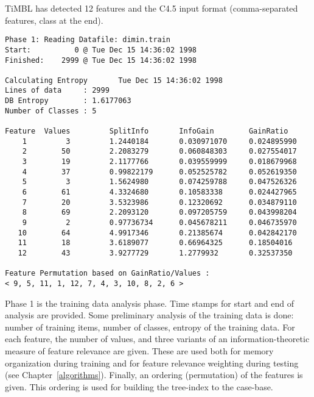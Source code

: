 \documentclass{report}
\begin{document}
\hline
\vspace{1cm}

TiMBL has detected 12 features and the C4.5 input format
(comma-separated features, class at the end).

\vspace{2cm}
\hline

{\small
\begin{verbatim}
Phase 1: Reading Datafile: dimin.train
Start:          0 @ Tue Dec 15 14:36:02 1998
Finished:    2999 @ Tue Dec 15 14:36:02 1998

Calculating Entropy       Tue Dec 15 14:36:02 1998
Lines of data     : 2999
DB Entropy        : 1.6177063
Number of Classes : 5

Feature  Values         SplitInfo       InfoGain        GainRatio
    1         3         1.2440184       0.030971070     0.024895990
    2        50         2.2083279       0.060848303     0.027554017
    3        19         2.1177766       0.039559999     0.018679968
    4        37         0.99822179      0.052525782     0.052619350
    5         3         1.5624980       0.074259788     0.047526326
    6        61         4.3324680       0.10583338      0.024427965
    7        20         3.5323986       0.12320692      0.034879110
    8        69         2.2093120       0.097205759     0.043998204
    9         2         0.97736734      0.045678211     0.046735970
   10        64         4.9917346       0.21385674      0.042842170
   11        18         3.6189077       0.66964325      0.18504016
   12        43         3.9277729       1.2779932       0.32537350

Feature Permutation based on GainRatio/Values :
< 9, 5, 11, 1, 12, 7, 4, 3, 10, 8, 2, 6 >
\end{verbatim}
}

\hline
\vspace{1cm}

Phase 1 is the training data analysis phase. Time stamps for start and
end of analysis are provided. Some preliminary analysis of the
training data is done: number of training items, number of classes,
entropy of the training data. For each feature, the number of values,
and three variants of an information-theoretic measure of feature
relevance are given. These are used both for memory organization
during training and for feature relevance weighting during testing
(see Chapter~\ref{algorithms}). Finally, an ordering (permutation) of
the features is given. This ordering is used for building the
tree-index to the case-base.
\end{document}
